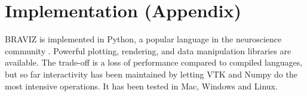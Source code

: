\documentclass[utf8,paper]{frontiersSCNS} %
\begin{document}
%
%
%






\section*{Implementation (Appendix)}

BRAVIZ is implemented in Python, a popular language in the neuroscience community \citep{gorgolewski_nipype:_2011, garyfallidis_dipy_2014}.  Powerful plotting, rendering, and data manipulation libraries are available. The trade-off is a loss of performance compared to compiled languages, but so far interactivity has been maintained by letting VTK\citep{schroeder_vtk_1998} and Numpy\citep{van_der_walt_numpy_2011} do the most intensive operations. It has been tested in Mac, Windows and Linux.
\end{document}
